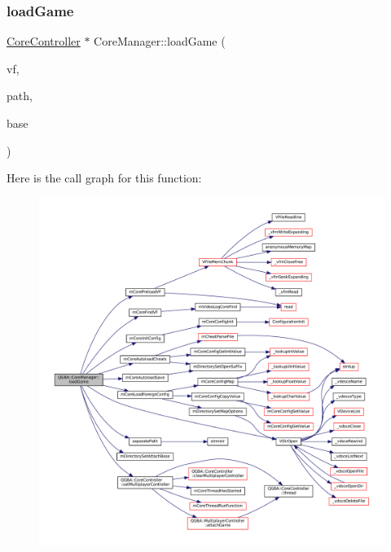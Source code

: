 \subsubsection{\texorpdfstring{load\+Game}{loadGame}\hspace{0.1cm}{\footnotesize\ttfamily [2/2]}}
{\footnotesize\ttfamily \mbox{\hyperlink{class_q_g_b_a_1_1_core_controller}{Core\+Controller}} $\ast$ Core\+Manager\+::load\+Game (\begin{DoxyParamCaption}\item[{V\+File $\ast$}]{vf,  }\item[{const Q\+String \&}]{path,  }\item[{const Q\+String \&}]{base }\end{DoxyParamCaption})\hspace{0.3cm}{\ttfamily [slot]}}

Here is the call graph for this function\+:
\nopagebreak
\begin{figure}[H]
\begin{center}
\leavevmode
\includegraphics[width=350pt]{class_q_g_b_a_1_1_core_manager_a1a53511511df13d821ffb60796213865_cgraph}
\end{center}
\end{figure}
\mbox{\label{class_q_g_b_a_1_1_core_manager_a2f071a4362e674aa29f19dd7e22fe433}} 
